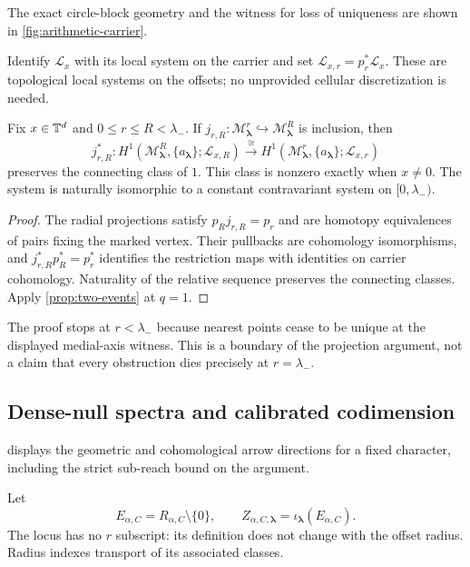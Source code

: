 \documentclass[11pt,a4paper]{article}
\begin{document}
The exact circle-block geometry and the witness for loss of uniqueness
are shown in \cref{fig:arithmetic-carrier}.


Identify $\mathcal L_x$ with its local system on the carrier and set
$\mathcal L_{x,r}=p_r^*\mathcal L_x$.  These are topological local
systems on the offsets; no unprovided cellular discretization is needed.

\begin{proposition}
\label{prop:offset}
Fix $x\in\mathbb T^d$ and $0\leq r\leq R<\lambda_-$.  If
$j_{r,R}:\mathcal M_{\boldsymbol\lambda}^r
\hookrightarrow\mathcal M_{\boldsymbol\lambda}^R$ is inclusion, then
\[
 j_{r,R}^*:H^1(\mathcal M_{\boldsymbol\lambda}^R,
                  \{a_{\boldsymbol\lambda}\};\mathcal L_{x,R})
 \xrightarrow{\ \cong\ }
 H^1(\mathcal M_{\boldsymbol\lambda}^r,
                  \{a_{\boldsymbol\lambda}\};\mathcal L_{x,r})
\]
preserves the connecting class of $1$.  This class is nonzero exactly when
$x\ne0$.  The system is naturally isomorphic to a constant contravariant
system on $[0,\lambda_-)$.
\end{proposition}

\begin{proof}
The radial projections satisfy $p_Rj_{r,R}=p_r$ and are homotopy
equivalences of pairs fixing the marked vertex.  Their pullbacks are
cohomology isomorphisms, and
$j_{r,R}^*p_R^*=p_r^*$ identifies the restriction maps with identities
on carrier cohomology.  Naturality of the relative sequence preserves
the connecting classes.  Apply \cref{prop:two-events} at $q=1$.
\end{proof}

The proof stops at $r<\lambda_-$ because nearest points cease to be
unique at the displayed medial-axis witness.  This is a boundary of the
projection argument, not a claim that every obstruction dies precisely
at $r=\lambda_-$.

\subsection{Dense-null spectra and calibrated codimension}

 displays the geometric and cohomological
arrow directions for a fixed character, including the strict sub-reach
bound on the argument.


Let
\[
 E_{\alpha,C}=R_{\alpha,C}\setminus\{0\},\qquad
 Z_{\alpha,C,\boldsymbol\lambda}
     =\iota_{\boldsymbol\lambda}(E_{\alpha,C}).
\]
The locus has no $r$ subscript: its definition does not change with the
offset radius.  Radius indexes transport of its associated classes.
\end{document}
